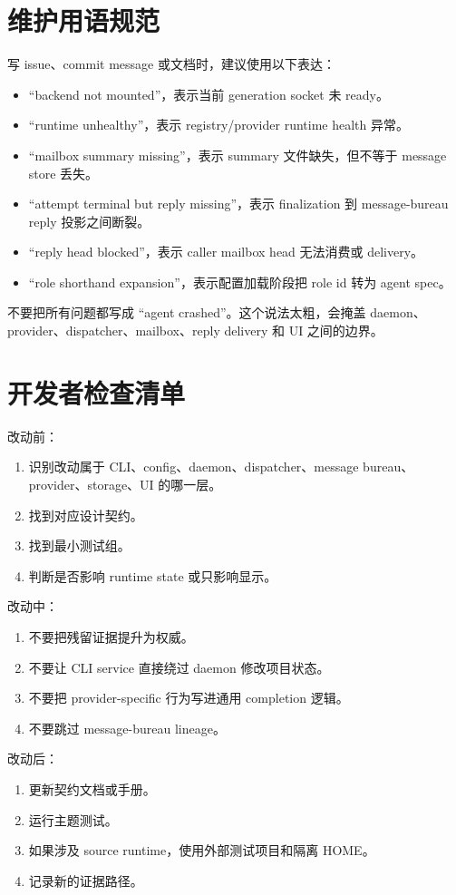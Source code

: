 \section{维护用语规范}

写 issue、commit message 或文档时，建议使用以下表达：

\begin{itemize}
  \item “backend not mounted”，表示当前 generation socket 未 ready。
  \item “runtime unhealthy”，表示 registry/provider runtime health 异常。
  \item “mailbox summary missing”，表示 summary 文件缺失，但不等于 message store 丢失。
  \item “attempt terminal but reply missing”，表示 finalization 到 message-bureau reply 投影之间断裂。
  \item “reply head blocked”，表示 caller mailbox head 无法消费或 delivery。
  \item “role shorthand expansion”，表示配置加载阶段把 role id 转为 agent spec。
\end{itemize}

不要把所有问题都写成 “agent crashed”。这个说法太粗，会掩盖 daemon、provider、dispatcher、mailbox、reply delivery 和 UI 之间的边界。

\section{开发者检查清单}

改动前：

\begin{enumerate}
  \item 识别改动属于 CLI、config、daemon、dispatcher、message bureau、provider、storage、UI 的哪一层。
  \item 找到对应设计契约。
  \item 找到最小测试组。
  \item 判断是否影响 runtime state 或只影响显示。
\end{enumerate}

改动中：

\begin{enumerate}
  \item 不要把残留证据提升为权威。
  \item 不要让 CLI service 直接绕过 daemon 修改项目状态。
  \item 不要把 provider-specific 行为写进通用 completion 逻辑。
  \item 不要跳过 message-bureau lineage。
\end{enumerate}

改动后：

\begin{enumerate}
  \item 更新契约文档或手册。
  \item 运行主题测试。
  \item 如果涉及 source runtime，使用外部测试项目和隔离 HOME。
  \item 记录新的证据路径。
\end{enumerate}
